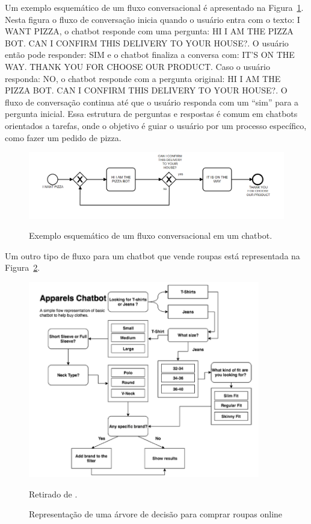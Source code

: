 \documentclass[14pt,a4paper,oneside]{book}
\begin{document}
Um exemplo esquemático de um fluxo conversacional é apresentado na Figura~\ref{fig:fluxo}. Nesta figura o fluxo de conversação inicia quando o usuário entra com o texto: I WANT PIZZA, o chatbot responde com uma pergunta: HI I AM THE PIZZA BOT. CAN I CONFIRM THIS DELIVERY TO YOUR HOUSE?. O usuário então pode responder: SIM e o chatbot finaliza a conversa com: IT'S ON THE WAY. THANK YOU FOR CHOOSE OUR PRODUCT. Caso o usuário responda: NO, o chatbot responde com a pergunta original: HI I AM THE PIZZA BOT. CAN I CONFIRM THIS DELIVERY TO YOUR HOUSE?. O fluxo de conversação continua até que o usuário responda com um ``sim'' para a pergunta inicial. Essa estrutura de perguntas e respostas é comum em chatbots orientados a tarefas, onde o objetivo é guiar o usuário por um processo específico, como fazer um pedido de pizza.

\begin{figure}
	\centering
	\caption{Exemplo esquemático de um fluxo conversacional em um chatbot.}
	\includegraphics[width=1\linewidth]{./fig/fluxo.png}
	\label{fig:fluxo}
\end{figure}

Um outro tipo de fluxo para um chatbot que vende roupas está representada na Figura~\ref{fig:representacaodeumaarvore}.

\begin{figure}
\caption{Representação de uma árvore de decisão para comprar roupas online}
\vspace{0.5cm}
    \centering
   	\vspace*{0,2cm}
    \includegraphics[width=0.9\textwidth]{./fig/image14.png}
    \label{fig:representacaodeumaarvore}
	{
	
	Retirado de \cite{Raj2019}.}
\end{figure}
\end{document}
